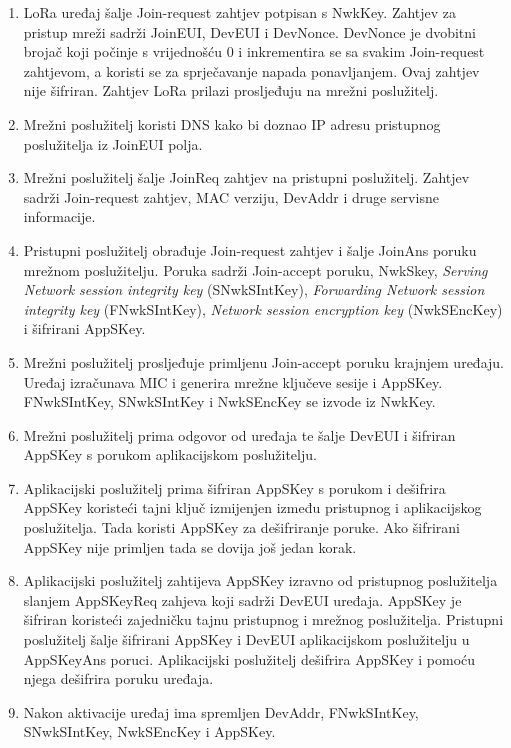 \documentclass[times, utf8, diplomski]{fer}
\begin{document}
\begin{enumerate}
    \item LoRa uređaj šalje Join-request zahtjev potpisan s NwkKey. Zahtjev za pristup mreži sadrži JoinEUI, DevEUI i DevNonce. DevNonce je dvobitni brojač koji počinje s vrijednošću 0 i inkrementira se sa svakim Join-request zahtjevom, a koristi se za sprječavanje napada ponavljanjem. Ovaj zahtjev nije šifriran. Zahtjev LoRa prilazi prosljeđuju na mrežni poslužitelj.
    \item Mrežni poslužitelj koristi DNS kako bi doznao IP adresu pristupnog poslužitelja iz JoinEUI polja.
    \item Mrežni poslužitelj šalje JoinReq zahtjev na pristupni poslužitelj. Zahtjev sadrži Join-request zahtjev, MAC verziju, DevAddr i druge servisne informacije.
    \item Pristupni poslužitelj obrađuje Join-request zahtjev i šalje JoinAns poruku mrežnom poslužitelju. Poruka sadrži Join-accept poruku, NwkSkey, \emph{Serving Network session integrity key} (SNwkSIntKey), \emph{Forwarding Network session integrity key} (FNwkSIntKey), \emph{Network session encryption key} (NwkSEncKey) i šifrirani AppSKey.
    \item Mrežni poslužitelj prosljeđuje primljenu Join-accept poruku krajnjem uređaju. Uređaj izračunava MIC i generira mrežne ključeve sesije i AppSKey. FNwkSIntKey, SNwkSIntKey i NwkSEncKey se izvode iz NwkKey.
    \item Mrežni poslužitelj prima odgovor od uređaja te šalje DevEUI i šifriran AppSKey s porukom aplikacijskom poslužitelju. 
    \item Aplikacijski poslužitelj prima šifriran AppSKey s porukom i dešifrira AppSKey koristeći tajni ključ izmijenjen između pristupnog i aplikacijskog poslužitelja. Tada koristi AppSKey za dešifriranje poruke. Ako šifrirani AppSKey nije primljen tada se dovija još jedan korak.
    \item Aplikacijski poslužitelj zahtijeva AppSKey izravno od pristupnog poslužitelja slanjem AppSKeyReq zahjeva koji sadrži DevEUI uređaja. AppSKey je šifriran koristeći zajedničku tajnu pristupnog i mrežnog poslužitelja. Pristupni poslužitelj šalje šifrirani AppSKey i DevEUI aplikacijskom poslužitelju u AppSKeyAns poruci. Aplikacijski poslužitelj dešifrira AppSKey i pomoću njega dešifrira poruku uređaja.
    \item Nakon aktivacije uređaj ima spremljen DevAddr, FNwkSIntKey, SNwkSIntKey, NwkSEncKey i AppSKey\citep{LoRaWAN}.
\end{enumerate}
\end{document}
